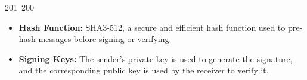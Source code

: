 201~200~\documentclass{article}
\begin{document}
\begin{itemize}
	                                                                                                                                                                                                                                                                                                	                                                                                                                                        	    	                                                                                                	                                                                                                                                                                                                                                                                                                                                	                                                                        	                                                                        	                                                                                                                                        	                                                                                                                                                                                                                        	                                                                                            \item \textbf{Hash Function:} SHA3-512, a secure and efficient hash function used to pre-hash messages before signing or verifying.
	                                                                                                                                                                                                                                                                                                	                                                                                                                                        	    	                                                                                                	                                                                                                                                                                                                                                                                                                                                	                                                                        	                                                                        	                                                                                                                                        	                                                                                                                                                                                                                        	                                                                                                \item \textbf{Signing Keys:} The sender's private key is used to generate the signature, and the corresponding public key is used by the receiver to verify it.

\end{itemize}
\end{document}
